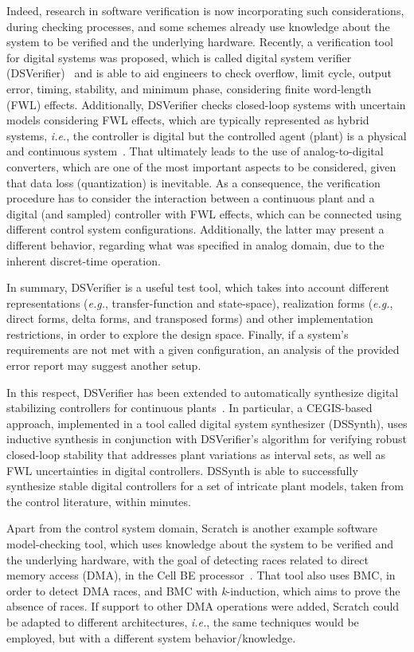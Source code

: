 \documentclass{acm_sen_article}
\begin{document}
Indeed, research in software verification is now incorporating such considerations, during checking processes, and some schemes already use knowledge about the system to be verified and the underlying hardware. Recently, a verification tool for digital systems was proposed, which is called digital system verifier (DSVerifier)~\cite{dsv_spin2015,Monteiro16} and is able to aid engineers to check overflow, limit cycle, output error, timing, stability, and minimum phase, considering finite word-length (FWL) effects. Additionally, DSVerifier checks closed-loop systems with uncertain models considering FWL effects, which are typically represented as hybrid systems, {\it i.e.}, the controller is digital but the controlled agent (plant) is a physical and continuous system~\cite{Bessa17}. That ultimately leads to the use of analog-to-digital converters, which are one of the most important aspects to be considered, given that data loss (quantization) is inevitable. As a consequence, the verification procedure has to consider the interaction between a continuous plant and a digital (and sampled) controller with FWL effects, which can be connected using different control system configurations. Additionally, the latter may present a different behavior, regarding what was specified in analog domain, due to the inherent discret-time operation. 


In summary, DSVerifier is a useful test tool, which takes into account different representations ({\it e.g.}, transfer-function and state-space), realization forms ({\it e.g.}, direct forms, delta forms, and transposed forms) and other implementation restrictions, in order to explore the design space. Finally, if a system's requirements are not met with a given configuration, an analysis of the provided error report may suggest another setup. 

In this respect, DSVerifier has been extended to automatically synthesize digital stabilizing controllers for continuous plants~\cite{Abate17}. In particular, a CEGIS-based approach, implemented in a tool called digital system synthesizer (DSSynth), uses inductive synthesis in conjunction with DSVerifier's algorithm for verifying robust closed-loop stability that addresses plant variations as interval sets, as well as FWL uncertainties in digital controllers. DSSynth is able to successfully synthesize stable digital controllers for a set of intricate plant models, taken from the control literature, within minutes.

Apart from the control system domain, Scratch is another example software model-checking tool, which uses knowledge about the system to be verified and the underlying hardware, with the goal of detecting races related to direct memory access (DMA), in the Cell BE processor~\cite{Donaldson10}. That tool also uses BMC, in order to detect DMA races, and BMC with \textit{k}-induction, which aims to prove the absence of races. If support to other DMA operations were added, Scratch could be adapted to different architectures, {\it i.e.}, the same techniques would be employed, but with a different system behavior/knowledge.
\end{document}
